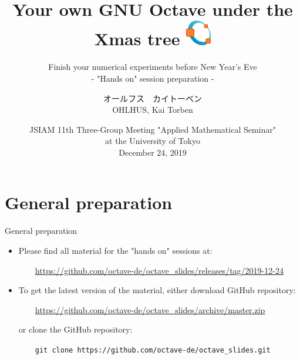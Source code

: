 \documentclass[xcolor=svgnames,aspectratio=169]{beamer}
\title[GNU Octave]{Your own GNU Octave under the Xmas tree
  \includegraphics[width=1.5em]{res/images/octave-logo-1024.png}
}
\subtitle{Finish your numerical experiments before New Year's Eve
\\[1em]
{\Large- "Hands on" session preparation -}}
\author[Kai T. Ohlhus]{
  オールフス　カイトーベン \\
  OHLHUS, Kai Torben}
\institute[TWCU]{
  Graduate School of Science \\
  Tokyo Woman's Christian University}
\date[December 24, 2019]{JSIAM 11th Three-Group Meeting "Applied Mathematical Seminar" \\
at the University of Tokyo \\[1em]
December 24, 2019}
\begin{document}
{
\frame{\titlepage}
}

\section{General preparation}

\frame{\tableofcontents}
\begin{frame}{General preparation}
\begin{itemize}
\item
Please find all material for the "hands on" sessions at:

\vfill

{\color{DarkBlue}
$\qquad$\url{https://github.com/octave-de/octave_slides/releases/tag/2019-12-24}
}

\vfill

\item
To get the latest version of the material,
either download GitHub repository:

\vfill

{\color{DarkBlue}
$\qquad$\url{https://github.com/octave-de/octave_slides/archive/master.zip}
}

\vfill

or clone the GitHub repository:

\vfill

$\qquad$\texttt{git clone https://github.com/octave-de/octave\_slides.git}
\end{itemize}


\end{frame}
\end{document}
